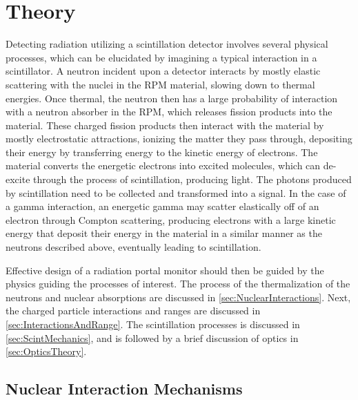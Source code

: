 \chapter{Theory}
\label{chap:theory}
Detecting radiation utilizing a scintillation detector involves several physical processes, which can be elucidated by imagining a typical interaction in a scintillator.
A neutron incident upon a detector interacts by mostly elastic scattering with the nuclei in the RPM material, slowing down to thermal energies.
Once thermal, the neutron then has a large probability of interaction with a neutron absorber in the RPM, which releases fission products into the material.
These charged fission products then interact with the material by mostly electrostatic attractions, ionizing the matter they pass through, depositing their energy by transferring  energy to the kinetic energy of electrons.
The material converts the energetic electrons into excited molecules, which can de-excite through the process of scintillation, producing light.
The photons produced by scintillation need to be collected and transformed into a signal.
In the case of a gamma interaction, an energetic gamma may scatter elastically off of an electron through Compton scattering, producing electrons with a large kinetic energy that deposit their energy in the material in a similar manner as the neutrons described above, eventually leading to scintillation.

Effective design of a radiation portal monitor should then be guided by the physics guiding the processes of interest.
The process of the thermalization of the neutrons and nuclear absorptions are discussed in \autoref{sec:NuclearInteractions}.
Next, the charged particle interactions and ranges are discussed in \autoref{sec:InteractionsAndRange}.
The scintillation processes is discussed in \autoref{sec:ScintMechanics}, and is followed by a brief discussion of optics in \autoref{sec:OpticsTheory}.

 
\section{Nuclear Interaction Mechanisms}
\label{sec:NuclearInteractions}



